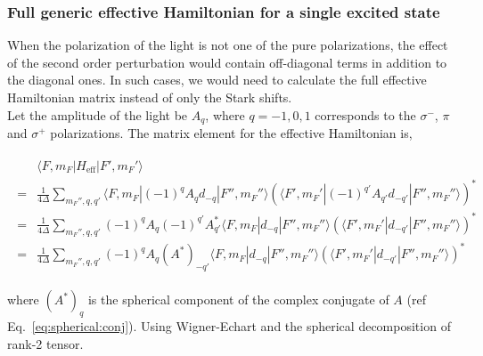 \documentclass[10pt,fleqn]{article}
\newcommand{\eqar}[1]
{
  \begin{align}
    #1
  \end{align}
}
\begin{document}
\subsubsection{Full generic effective Hamiltonian for a single excited state}
\label{full-effective-explicit}
When the polarization of the light is not one of the pure polarizations,
the effect of the second order perturbation would contain off-diagonal terms in addition
to the diagonal ones. In such cases, we would need to calculate the full effective
Hamiltonian matrix instead of only the Stark shifts.\\

Let the amplitude of the light be $A_q$, where $q=-1,0,1$ corresponds to the $\sigma^-$, $\pi$ and $\sigma^+$ polarizations. The matrix element for the effective Hamiltonian is,

\eqar{
  \begin{split}
    &\langle F,m_F|H_{\mathrm{eff}}|F',m_F'\rangle\\
    =&\frac{1}{4\Delta}\sum_{m_F'',q,q'}\langle F,m_F|(-1)^qA_{q}d_{-q}|F'',m_F''\rangle(\langle F',m_F'|(-1)^{q'}A_{q'}d_{-q'}|F'',m_F''\rangle)^*\\
    =&\frac{1}{4\Delta}\sum_{m_F'',q,q'}(-1)^qA_{q}(-1)^{q'}A_{q'}^*\langle F,m_F|d_{-q}|F'',m_F''\rangle(\langle F',m_F'|d_{-q'}|F'',m_F''\rangle)^*\\
    =&\frac{1}{4\Delta}\sum_{m_F'',q,q'}(-1)^qA_{q}(A^*)_{-q'}\langle F,m_F|d_{-q}|F'',m_F''\rangle(\langle F',m_F'|d_{-q'}|F'',m_F''\rangle)^*
  \end{split}
}
where $(A^*)_{q}$ is the spherical component of the complex conjugate of $A$ (ref Eq.~\ref{eq:spherical:conj}). Using Wigner-Echart and the spherical decomposition of rank-2 tensor.
\end{document}

